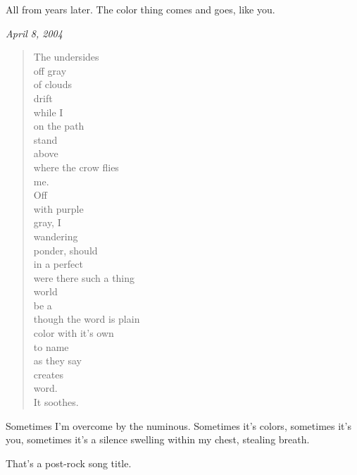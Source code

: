 \begin{paracol}{2}
\begin{leftcolumn}
All from years later. The color thing comes and goes, like you.
\end{leftcolumn}
\begin{rightcolumn*}
\begin{flushright}
\emph{April 8, 2004}
\end{flushright}
\end{rightcolumn*}
\begin{leftcolumn}
\begin{verse}
The undersides\\
\vin \vin off gray\\
\vin of clouds\\
\vin drift\\
\vin \vin while I\\
\vin \vin \vin on the path\\
\vin \vin stand\\
\vin above\\
\vin \vin where the crow flies\\
\vin me.\\
Off\\
\vin \vin with purple\\
\vin gray, I\\
\vin \vin wandering\\
\vin ponder, should\\
\vin \vin in a perfect\\
\vin \vin \vin were there such a thing\\
\vin \vin world\\
\vin be a\\
\vin \vin though the word is plain\\
\vin color with it's own\\
\vin \vin to name\\
\vin \vin \vin as they say\\
\vin \vin creates\\
\vin word.\\
It soothes.
\end{verse}

Sometimes I'm overcome by the numinous. Sometimes it's colors, sometimes it's you, sometimes it's a silence swelling within my chest, stealing breath.


That's a post-rock song title.


\end{leftcolumn}
\end{paracol}
